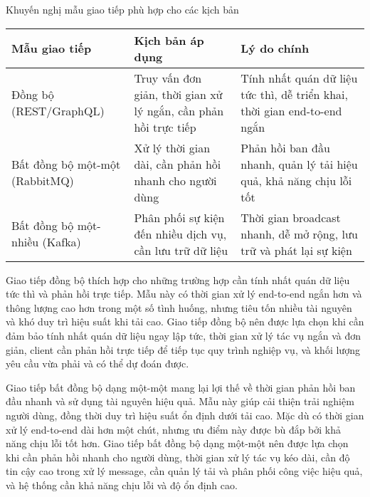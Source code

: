 \begin{table}[H]{Khuyến nghị mẫu giao tiếp phù hợp cho các kịch bản}
    \centering
    {\setlength{\arrayrulewidth}{1pt}
        \renewcommand{\arraystretch}{1.5}
        \setlength{\tabcolsep}{6pt}
        \begin{tabular}{|p{3.2cm}|p{3.2cm}|p{4.6cm}|}
            \hline
            \textbf{Mẫu giao tiếp}         & \textbf{Kịch bản áp dụng}                                       & \textbf{Lý do chính}                                                     \\
            \hline
            Đồng bộ (REST/GraphQL)         & Truy vấn đơn giản, thời gian xử lý ngắn, cần phản hồi trực tiếp & Tính nhất quán dữ liệu tức thì, dễ triển khai, thời gian end-to-end ngắn \\
            \hline
            Bất đồng bộ một-một (RabbitMQ) & Xử lý thời gian dài, cần phản hồi nhanh cho người dùng          & Phản hồi ban đầu nhanh, quản lý tải hiệu quả, khả năng chịu lỗi tốt      \\
            \hline
            Bất đồng bộ một-nhiều (Kafka)  & Phân phối sự kiện đến nhiều dịch vụ, cần lưu trữ dữ liệu        & Thời gian broadcast nhanh, dễ mở rộng, lưu trữ và phát lại sự kiện       \\
            \hline
        \end{tabular}}
\end{table}

Giao tiếp đồng bộ thích hợp cho những trường hợp cần tính nhất quán dữ liệu tức thì và phản hồi trực tiếp. Mẫu này có thời gian xử lý end-to-end ngắn hơn và thông lượng cao hơn trong một số tình huống, nhưng tiêu tốn nhiều tài nguyên và khó duy trì hiệu suất khi tải cao. Giao tiếp đồng bộ nên được lựa chọn khi cần đảm bảo tính nhất quán dữ liệu ngay lập tức, thời gian xử lý tác vụ ngắn và đơn giản, client cần phản hồi trực tiếp để tiếp tục quy trình nghiệp vụ, và khối lượng yêu cầu vừa phải và có thể dự đoán được.

Giao tiếp bất đồng bộ dạng một-một mang lại lợi thế về thời gian phản hồi ban đầu nhanh và sử dụng tài nguyên hiệu quả. Mẫu này giúp cải thiện trải nghiệm người dùng, đồng thời duy trì hiệu suất ổn định dưới tải cao. Mặc dù có thời gian xử lý end-to-end dài hơn một chút, nhưng ưu điểm này được bù đắp bởi khả năng chịu lỗi tốt hơn. Giao tiếp bất đồng bộ dạng một-một nên được lựa chọn khi cần phản hồi nhanh cho người dùng, thời gian xử lý tác vụ kéo dài, cần độ tin cậy cao trong xử lý message, cần quản lý tải và phân phối công việc hiệu quả, và hệ thống cần khả năng chịu lỗi và độ ổn định cao.

